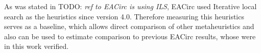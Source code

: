 \documentclass[
  print, %
  Table,   %
  nolof,     %
  nolot,     %
  11pt, %
  oneside  %
]{fithesis3}
\newcommand{\todo}[1]{TODO: \textit{#1}}
\newcommand{\fd}{\cellcolor{red!13}}
\newcommand{\fn}{\cellcolor{green!13}}
\begin{document}
As was stated in \todo{ref to EACirc is using ILS}, EACirc used Iterative local search as the heuristics since version 4.0. Therefore measuring this heuristics serves as a baseline, which allows direct comparison of other metaheuristics and also can be used to estimate comparison to previous EACirc results, whose were in this work verified.

\end{document}
